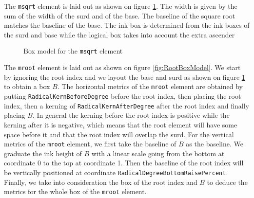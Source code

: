The {\tt msqrt} element is laid out as shown on figure
\ref{fig:SquareRootBoxModel}.
The width is given by the sum of the width of the surd and of the base.
The baseline of the square root matches the baseline of the base.
The ink box is determined from the ink boxes of the surd and base while the
logical box takes into account the extra ascender

\begin{figure}
\centering
{}
\caption{Box model for the {\tt msqrt} element}
\label{fig:SquareRootBoxModel}
\end{figure}

The {\tt mroot} element is laid out as shown on figure \ref{fig:RootBoxModel}.
We start by ignoring the root index and we layout the base and surd as
shown on figure \ref{fig:SquareRootBoxModel} to obtain a box $B$.
The horizontal metrics of the {\tt mroot} element are obtained by putting
{\tt RadicalKernBeforeDegree}
before the root index, then placing the root index, then a kerning
of {\tt RadicalKernAfterDegree}
after the root index and finally placing $B$. In general
the kerning before the root index is positive while the kerning after it is
negative,
which means that the root element will have some space before it and that the
root index will overlap the surd.
For the vertical metrics of the {\tt mroot} element, we first take the baseline
of $B$ as the baseline. We graduate the ink height of $B$ with a linear
scale going from the bottom at coordinate 0 to the top at coordinate 1.
Then the baseline of the root index will
be vertically positioned at coordinate
{\tt RadicalDegreeBottomRaisePercent}.
Finally, we take into consideration the box of the root index and $B$ to deduce
the metrics for the whole box of the {\tt mroot} element.

